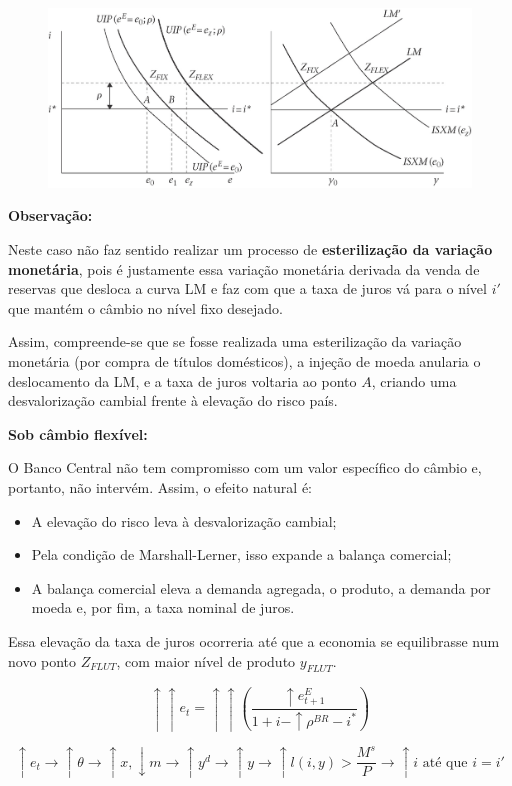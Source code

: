 \documentclass[a4paper,12pt]{article}[abntex2]
\begin{document}
\begin{figure}[H]
    \centering
    \includegraphics[width=0.7\linewidth]{Imagens/a24i3.png}
\end{figure}

\textbf{Observação:}

Neste caso não faz sentido realizar um processo de \textbf{esterilização da variação monetária}, pois é justamente essa variação monetária derivada da venda de reservas que desloca a curva LM e faz com que a taxa de juros vá para o nível $i'$ que mantém o câmbio no nível fixo desejado.

Assim, compreende-se que se fosse realizada uma esterilização da variação monetária (por compra de títulos domésticos), a injeção de moeda anularia o deslocamento da LM, e a taxa de juros voltaria ao ponto $A$, criando uma desvalorização cambial frente à elevação do risco país.

\textbf{Sob câmbio flexível:}

O Banco Central não tem compromisso com um valor específico do câmbio e, portanto, não intervém. Assim, o efeito natural é:

\begin{itemize}
  \item A elevação do risco leva à desvalorização cambial;
  \item Pela condição de Marshall-Lerner, isso expande a balança comercial;
  \item A balança comercial eleva a demanda agregada, o produto, a demanda por moeda e, por fim, a taxa nominal de juros.
\end{itemize}

Essa elevação da taxa de juros ocorreria até que a economia se equilibrasse num novo ponto $Z_{FLUT}$, com maior nível de produto $y_{FLUT}$.

\[
\uparrow\uparrow e_t = \uparrow\uparrow \left( \frac{\uparrow e^E_{t+1}}{1 + i - \uparrow \rho^{BR} - i^*} \right)
\]

\[
\uparrow e_t \rightarrow \uparrow \theta \rightarrow \uparrow x, \downarrow m \rightarrow \uparrow y^d \rightarrow \uparrow y \rightarrow \uparrow l(i,y) > \frac{M^s}{P} \rightarrow \uparrow i \text{ até que } i = i'
\]
\end{document}
